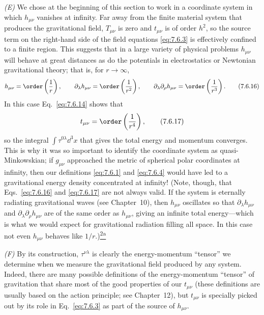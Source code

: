 \medskip
\noindent\textit{(E)} We chose at the beginning of this section to work in
a coordinate system in which \(h_{\mu\nu}\) vanishes at infinity. Far away
from the finite material system that produces the gravitational field,
\(T_{\mu\nu}\) is zero and \(t_{\mu\nu}\) is of order \(h^2\), so the source
term on the right-hand side of the field equations \eqref{eq:7.6.3} is
effectively confined to a finite region. This suggests that in a large
variety of physical problems \(h_{\mu\nu}\) will behave at great distances
as do the potentials in electrostatics or Newtonian gravitational theory;
that is, for \(r\to\infty\),
\begin{equation}
  h_{\mu\nu}=\order\left(\frac1r\right),
  \qquad
  \partial_\lambda h_{\mu\nu}
  =\order\left(\frac1{r^2}\right),
  \qquad
  \partial_\lambda\partial_\rho h_{\mu\nu}
  =\order\left(\frac1{r^3}\right).
  \tag{7.6.16}\label{eq:7.6.16}
\end{equation}
In this case Eq.~\eqref{eq:7.6.14} shows that
\begin{equation}
  t_{\mu\nu}=\order\left(\frac1{r^4}\right),
  \tag{7.6.17}\label{eq:7.6.17}
\end{equation}
so the integral \(\int\tau^{0\lambda}\dd^3x\) that gives the total energy
and momentum converges. This is why it was so important to identify the
coordinate system as quasi-Minkowskian; if \(g_{\mu\nu}\) approached the
metric of spherical polar coordinates at infinity, then our definitions
\eqref{eq:7.6.1} and \eqref{eq:7.6.4} would have led to a gravitational
energy density concentrated at infinity! (Note, though, that
Eqs.~\eqref{eq:7.6.16} and \eqref{eq:7.6.17} are not always valid. If the
system is eternally radiating gravitational waves (see Chapter~10), then
\(h_{\mu\nu}\) oscillates so that \(\partial_\lambda h_{\mu\nu}\) and
\(\partial_\lambda\partial_\rho h_{\mu\nu}\) are of the same order as
\(h_{\mu\nu}\), giving an infinite total energy---which is what we would
expect for gravitational radiation filling all space. In this case not even
\(h_{\mu\nu}\) behaves like \(1/r\).)\hyperref[ch7-ref-2a]{\textsuperscript{2a}}

\medskip
\noindent\textit{(F)} By its construction, \(\tau^{\nu\lambda}\) is
clearly the energy-momentum ``tensor'' we determine when we measure the
gravitational field produced by any system. Indeed, there are many possible
definitions of the energy-momentum ``tensor'' of gravitation that share
most of the good properties of our \(t_{\mu\nu}\) (these definitions are
usually based on the action principle; see Chapter~12), but \(t_{\mu\nu}\)
is specially picked out by its role in Eq.~\eqref{eq:7.6.3} as part of the
source of \(h_{\mu\nu}\).

